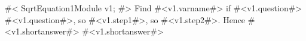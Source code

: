 

#<
SqrtEquation1Module v1;
#>
Find #<v1.varname#> if #<v1.question#>
#<v1.question#>, so #<v1.step1#>, so #<v1.step2#>. Hence #<v1.shortanswer#>
#<v1.shortanswer#>

